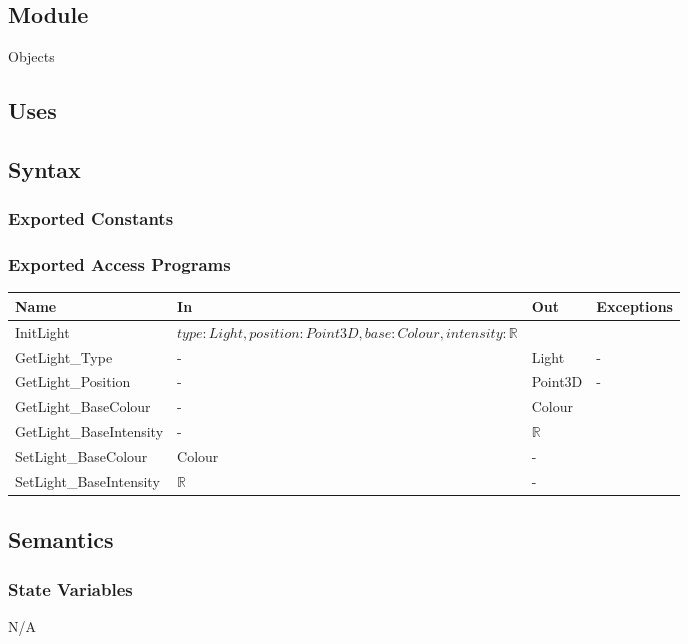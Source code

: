 \documentclass[12pt, titlepage]{article}
\begin{document}
\subsection{Module}
Objects

\subsection{Uses}

\subsection{Syntax}
\subsubsection{Exported Constants}
\subsubsection{Exported Access Programs}
\begin{center}
	\begin{tabular}{p{4cm} p{2cm} p{2cm} p{4cm}}
		\hline
		\textbf{Name} & \textbf{In} & \textbf{Out} & \textbf{Exceptions} \\
		\hline
		InitLight & $type: Light, position : Point3D, base : Colour, intensity 
		: \mathbb{R}$  & & \\
		GetLight\_Type & - & Light & - \\
		GetLight\_Position & - & Point3D & - \\
		GetLight\_BaseColour &- & Colour & \\
		GetLight\_BaseIntensity & - & $\mathbb{R}$& \\
		SetLight\_BaseColour & Colour &- & \\
		SetLight\_BaseIntensity & $\mathbb{R}$ & - & \\
		\hline
	\end{tabular}
\end{center}

\subsection{Semantics}
\subsubsection{State Variables}
N/A
\end{document}
